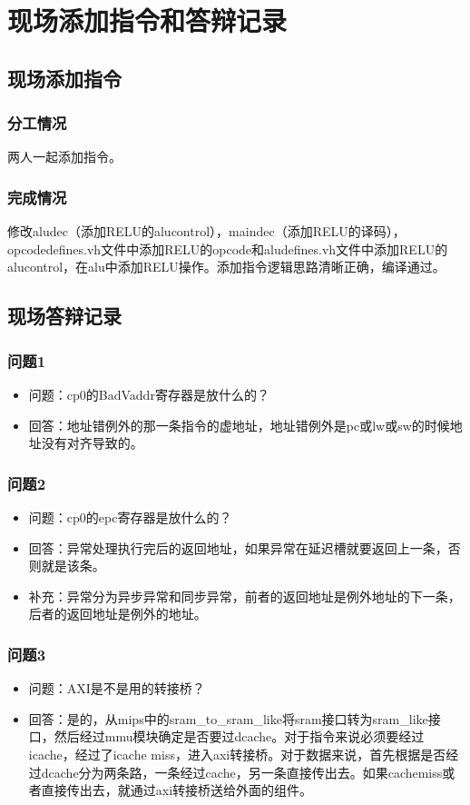 \section{现场添加指令和答辩记录}

\subsection{现场添加指令}
\subsubsection{分工情况}
两人一起添加指令。
\subsubsection{完成情况}
修改aludec（添加RELU的alucontrol），maindec（添加RELU的译码），opcodedefines.vh文件中添加RELU的opcode和aludefines.vh文件中添加RELU的alucontrol，在alu中添加RELU操作。添加指令逻辑思路清晰正确，编译通过。
\subsection{现场答辩记录}
\subsubsection{问题1}
\begin{itemize}
    \item 问题：cp0的BadVaddr寄存器是放什么的？
    \item \stunameb 回答：地址错例外的那一条指令的虚地址，地址错例外是pc或lw或sw的时候地址没有对齐导致的。
\end{itemize}
\subsubsection{问题2}
\begin{itemize}
    \item 问题：cp0的epc寄存器是放什么的？
    \item \stunameb 回答：异常处理执行完后的返回地址，如果异常在延迟槽就要返回上一条，否则就是该条。
    \item \stunamea 补充：异常分为异步异常和同步异常，前者的返回地址是例外地址的下一条，后者的返回地址是例外的地址。
\end{itemize}
\subsubsection{问题3}
\begin{itemize}
    \item 问题：AXI是不是用的转接桥？
    \item \stunameb 回答：是的，从mips中的sram\_to\_sram\_like将sram接口转为sram\_like接口，然后经过mmu模块确定是否要过dcache。对于指令来说必须要经过icache，经过了icache miss，进入axi转接桥。对于数据来说，首先根据是否经过dcache分为两条路，一条经过cache，另一条直接传出去。如果cachemiss或者直接传出去，就通过axi转接桥送给外面的组件。
\end{itemize}
